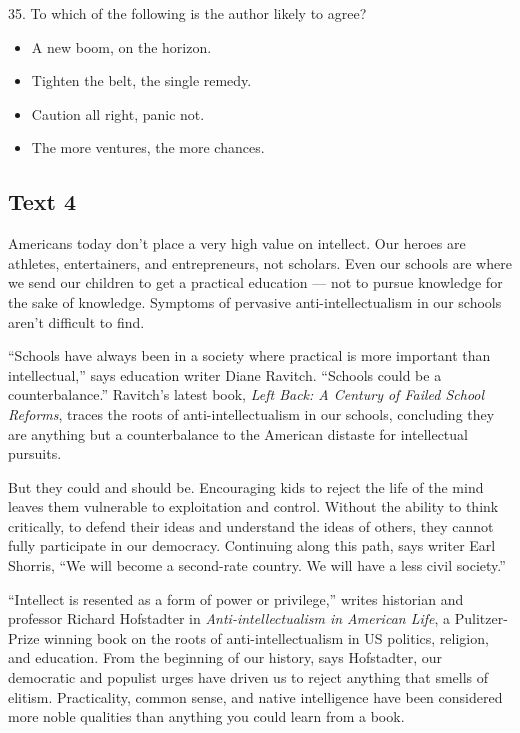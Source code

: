 \documentclass[UTF8,11pt]{ctexart}
\begin{document}
35. To which of the following is the author likely to agree?


\begin{itemize}[leftmargin=2em,itemsep=.2em,topsep=.4em]\item[A.] A new boom, on the horizon.
\item[B.] Tighten the belt, the single remedy.
\item[C.] Caution all right, panic not.
\item[D.] The more ventures, the more chances.
\end{itemize}

\subsection*{\textbf{Text 4}}


Americans today don’t place a very high value on intellect. Our heroes are athletes, entertainers, and entrepreneurs, not scholars. Even our schools are where we send our children to get a practical education — not to pursue knowledge for the sake of knowledge. Symptoms of pervasive anti-intellectualism in our schools aren’t difficult to find.


“Schools have always been in a society where practical is more important than intellectual,” says education writer Diane Ravitch. “Schools could be a counterbalance.” Ravitch’s latest book, \textit{Left Back: A Century of Failed School Reforms}, traces the roots of anti-intellectualism in our schools, concluding they are anything but a counterbalance to the American distaste for intellectual pursuits.


But they could and should be. Encouraging kids to reject the life of the mind leaves them vulnerable to exploitation and control. Without the ability to think critically, to defend their ideas and understand the ideas of others, they cannot fully participate in our democracy. Continuing along this path, says writer Earl Shorris, “We will become a second-rate country. We will have a less civil society.”


“Intellect is resented as a form of power or privilege,” writes historian and professor Richard Hofstadter in \textit{Anti-intellectualism in American Life}, a Pulitzer-Prize winning book on the roots of anti-intellectualism in US politics, religion, and education. From the beginning of our history, says Hofstadter, our democratic and populist urges have driven us to reject anything that smells of elitism. Practicality, common sense, and native intelligence have been considered more noble qualities than anything you could learn from a book.
\end{document}
